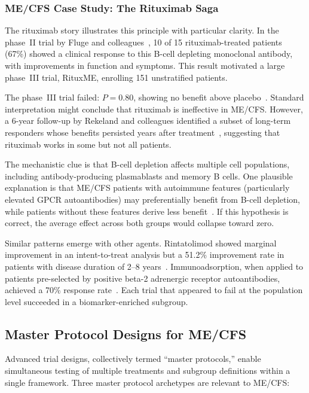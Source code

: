 \subsubsection{ME/CFS Case Study: The Rituximab Saga}

The rituximab story illustrates this principle with particular clarity. In the phase~II trial by Fluge and colleagues~\cite{Fluge2011}, 10 of 15 rituximab-treated patients (67\%) showed a clinical response to this B-cell depleting monoclonal antibody, with improvements in function and symptoms. This result motivated a large phase~III trial, RituxME, enrolling 151 unstratified patients.

The phase~III trial failed: $P = 0.80$, showing no benefit above placebo~\cite{Fluge2019}. Standard interpretation might conclude that rituximab is ineffective in ME/CFS. However, a 6-year follow-up by Rekeland and colleagues identified a subset of long-term responders whose benefits persisted years after treatment~\cite{Rekeland2024}, suggesting that rituximab works in some but not all patients.

The mechanistic clue is that B-cell depletion affects multiple cell populations, including antibody-producing plasmablasts and memory B cells. One plausible explanation is that ME/CFS patients with autoimmune features (particularly elevated GPCR autoantibodies) may preferentially benefit from B-cell depletion, while patients without these features derive less benefit~\cite{Scheibenbogen2018immunoadsorption}. If this hypothesis is correct, the average effect across both groups would collapse toward zero.

Similar patterns emerge with other agents. Rintatolimod showed marginal improvement in an intent-to-treat analysis but a 51.2\% improvement rate in patients with disease duration of 2--8 years~\cite{Strayer2020}. Immunoadsorption, when applied to patients pre-selected by positive beta-2 adrenergic receptor autoantibodies, achieved a 70\% response rate~\cite{Stein2024immunoadsorption}. Each trial that appeared to fail at the population level succeeded in a biomarker-enriched subgroup.

\subsection{Master Protocol Designs for ME/CFS}

Advanced trial designs, collectively termed ``master protocols,'' enable simultaneous testing of multiple treatments and subgroup definitions within a single framework. Three master protocol archetypes are relevant to ME/CFS:

